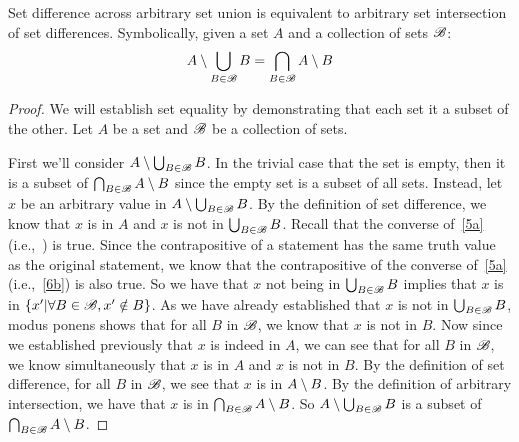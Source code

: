 \documentclass[main.tex]{subfiles}
\begin{document}
\subproblem{}\label{9a}

\begin{thm}
	Set difference across arbitrary set union is equivalent to arbitrary set
	intersection of set differences. Symbolically, given a set \(A\) and a
	collection of sets \(\mathscr{B}\):
	\[A \setminus \bigcup\limits_{B \in \mathscr{B}} {B} = \bigcap\limits_{B \in \mathscr{B}} {A \setminus B}\]
\end{thm}
\begin{proof}
	We will establish set equality by demonstrating that each set it a
	subset of the other. Let \(A\) be a set and \(\mathscr{B}\) be a
	collection of sets.

	\medskip{}
	First we'll consider \(A \setminus \bigcup_{B \in \mathscr{B}} {B}\).
	In the trivial case that the set is empty, then it is a subset of
	\(\bigcap_{B \in \mathscr{B}} {A \setminus B}\) since the
	empty set is a subset of all sets. Instead, let \(x\) be an arbitrary
	value in \(A \setminus \bigcup_{B \in \mathscr{B}} {B}\). By the
	definition of set difference, we know that \(x\) is in \(A\) and \(x\)
	is not in \(\bigcup_{B \in \mathscr{B}} {B}\). Recall that the
	converse of~\ref{5a} (i.e.,~) is true. Since the
	contrapositive of a statement has the same truth value as the original
	statement, we know that the contrapositive of the converse of~\ref{5a}
	(i.e.,~\ref{6b}) is also true. So we have that \(x\) not being in
	\(\bigcup_{B \in \mathscr{B}} {B}\) implies that \(x\) is in
	\(\{x'|\forall B \in \mathscr{B}, x' \notin B\}\). As we have
	already established that \(x\) is not in
	\(\bigcup_{B \in \mathscr{B}} {B}\), modus ponens shows that for
	all \(B\) in \(\mathscr{B}\), we know that \(x\) is not in \(B\). Now
	since we established previously that \(x\) is indeed in \(A\), we can
	see that for all \(B\) in \(\mathscr{B}\), we know simultaneously that
	\(x\) is in \(A\) and \(x\) is not in \(B\). By the definition of set
	difference, for all \(B\) in \(\mathscr{B}\), we see that \(x\) is in
	\(A \setminus B\). By the definition of arbitrary intersection, we have
	that \(x\) is in
	\(\bigcap_{B \in \mathscr{B}} {A \setminus B}\). So
	\(A \setminus \bigcup_{B \in \mathscr{B}} {B}\) is a subset of
	\(\bigcap_{B \in \mathscr{B}} {A \setminus B}\).


\end{proof}
\end{document}
